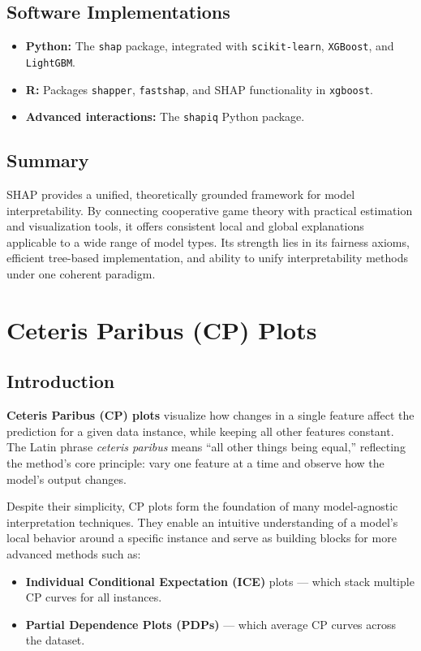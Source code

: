 \subsection{Software Implementations}

\begin{itemize}
    \item \textbf{Python:} The \texttt{shap} package, integrated with \texttt{scikit-learn}, \texttt{XGBoost}, and \texttt{LightGBM}.
    \item \textbf{R:} Packages \texttt{shapper}, \texttt{fastshap}, and SHAP functionality in \texttt{xgboost}.
    \item \textbf{Advanced interactions:} The \texttt{shapiq} Python package.
\end{itemize}

\subsection{Summary}

SHAP provides a unified, theoretically grounded framework for model interpretability.  
By connecting cooperative game theory with practical estimation and visualization tools, it offers consistent local and global explanations applicable to a wide range of model types.  
Its strength lies in its fairness axioms, efficient tree-based implementation, and ability to unify interpretability methods under one coherent paradigm.


\section{Ceteris Paribus (CP) Plots}

\subsection{Introduction}

\textbf{Ceteris Paribus (CP) plots} \citep{Kuzba2019CeterisParibus} visualize how changes in a single feature affect the prediction for a given data instance, while keeping all other features constant.  
The Latin phrase \textit{ceteris paribus} means “all other things being equal,” reflecting the method’s core principle: vary one feature at a time and observe how the model’s output changes.

Despite their simplicity, CP plots form the foundation of many model-agnostic interpretation techniques.  
They enable an intuitive understanding of a model’s local behavior around a specific instance and serve as building blocks for more advanced methods such as:
\begin{itemize}
    \item \textbf{Individual Conditional Expectation (ICE)} plots — which stack multiple CP curves for all instances.
    \item \textbf{Partial Dependence Plots (PDPs)} — which average CP curves across the dataset.
\end{itemize}

